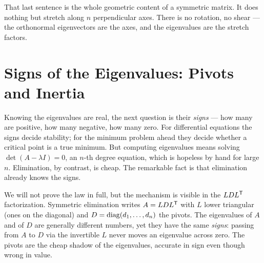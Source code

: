 
That last sentence is the whole geometric content of a symmetric matrix. It does nothing but stretch along $n$ perpendicular axes. There is no rotation, no shear --- the orthonormal eigenvectors are the axes, and the eigenvalues are the stretch factors.

\section{Signs of the Eigenvalues: Pivots and Inertia}

Knowing the eigenvalues are real, the next question is their \emph{signs} --- how many are positive, how many negative, how many zero. For differential equations the signs decide stability; for the minimum problem ahead they decide whether a critical point is a true minimum. But computing eigenvalues means solving $\det(A-\lambda I)=0$, an $n$-th degree equation, which is hopeless by hand for large $n$. Elimination, by contrast, is cheap. The remarkable fact is that elimination already knows the signs.


We will not prove the law in full, but the mechanism is visible in the $LDL^{\mathsf T}$ factorization. Symmetric elimination writes $A=LDL^{\mathsf T}$ with $L$ lower triangular (ones on the diagonal) and $D=\operatorname{diag}(d_1,\dots,d_n)$ the pivots. The eigenvalues of $A$ and of $D$ are generally different numbers, yet they have the same \emph{signs}: passing from $A$ to $D$ via the invertible $L$ never moves an eigenvalue across zero. The pivots are the cheap shadow of the eigenvalues, accurate in sign even though wrong in value.

